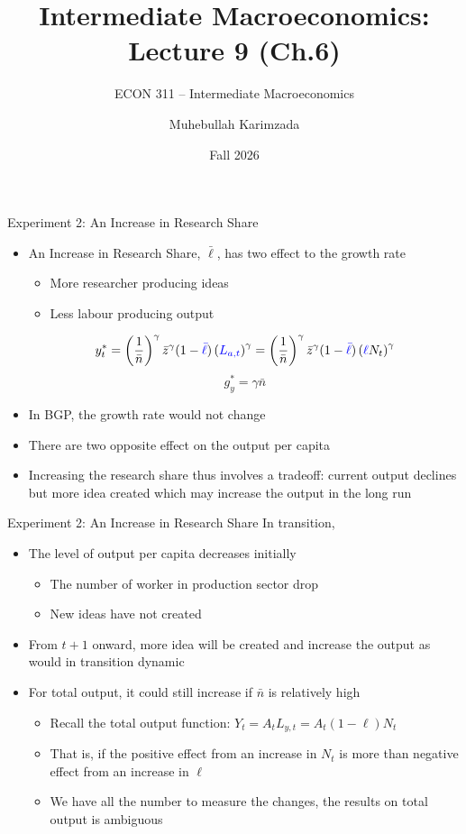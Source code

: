 \documentclass[aspectratio=1610]{beamer}
\title[Fall - Lecture 9] %
{Intermediate Macroeconomics: Lecture  9 (Ch.6)}
\subtitle{ECON 311 -- Intermediate Macroeconomics}
\author{Muhebullah Karimzada}
\institute{School of Economics \\\ University of Northern British Columbia}
\date{Fall 2026}
\begin{document}
\begin{frame}[plain]
  \titlepage
\end{frame}

\begin{frame}[wide]{Experiment 2: An Increase in Research Share }
	\begin{itemize}
		\item An Increase in Research Share, $\bar{\ell}$, has two effect to the growth rate
		\begin{itemize}
			\item More researcher producing ideas
			\item Less labour producing output
		\end{itemize}
		\[y_t^* = \left(\frac{1}{\bar{n}}\right)^\gamma \bar{z}^\gamma  (1-\textcolor{blue}{\bar{\ell}}) \left( \textcolor{blue}{L_{a,t}}\right)^\gamma = \left(\frac{1}{\bar{n}}\right)^\gamma \bar{z}^\gamma  (1-\textcolor{blue}{\bar{\ell}}) \left(  \textcolor{blue}{\ell} N_t \right)^\gamma \]
		\[	g_y^* = \gamma \bar{n} \]
		\item In BGP, the growth rate would not change
		\item There are two opposite effect on the output per capita
		\item Increasing the research share thus involves a tradeoff: current output declines but more idea created which may increase the output in the long run
	\end{itemize}
\end{frame}

\begin{frame}[wide]{Experiment 2: An Increase in Research Share }
	In transition, 
	\begin{itemize}
		\item The level of output per capita decreases initially
		\begin{itemize}
			\item The number of worker in production sector drop
			\item New ideas have not created
		\end{itemize}
		\item From $t+1$ onward, more idea will be created and increase the output as would in transition dynamic
		\item For total output, it could still increase if $\bar{n}$ is relatively high 
		\begin{itemize}
			\item Recall the total output function: $Y_t=A_tL_{y,t} = A_t (1-\ell) N_t$
			\item That is, if the positive effect from an increase in $N_t$ is more than negative effect from an increase in $\ell$
			\item We have all the number to measure the changes, the results on total output is ambiguous
		\end{itemize}
	\end{itemize}
\end{frame}
\end{document}
